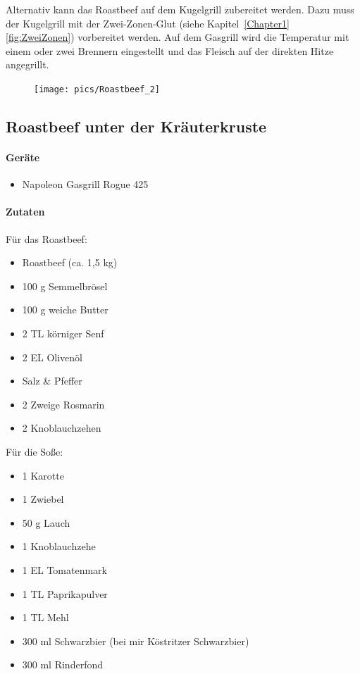 Alternativ kann das Roastbeef auf dem Kugelgrill zubereitet werden. Dazu
muss der Kugelgrill mit der Zwei-Zonen-Glut (siehe Kapitel~\ref{Chapter1} 
\vref{fig:ZweiZonen}) vorbereitet werden. Auf dem
Gasgrill wird die Temperatur mit einem oder zwei Brennern eingestellt und
das Fleisch auf der direkten Hitze angegrillt.
\newpage
\begin{figure}[htbp]
	\centering
	\begin{minipage}{1\textwidth}
		\centering
		\texttt{[image: pics/Roastbeef\_2]}
		\label{fig:Roastbeef}
	\end{minipage}
\end{figure}
\newpage

\subsection{Roastbeef unter der Kräuterkruste}

\paragraph{Geräte}

\begin{itemize}[noitemsep]
	\item Napoleon Gasgrill Rogue 425
\end{itemize}

\paragraph{Zutaten}

Für das Roastbeef:

\begin{itemize}[noitemsep]
	\item Roastbeef (ca. 1,5 kg) 
	\item 100 g Semmelbrösel
	\item 100 g weiche Butter
	\item 2 TL körniger Senf
	\item 2 EL Olivenöl
	\item Salz  \& Pfeffer
	\item 2 Zweige Rosmarin
	\item 2 Knoblauchzehen
\end{itemize}

Für die Soße:

\begin{itemize}[noitemsep]
\item 1 Karotte
\item 1 Zwiebel
\item 50 g Lauch
\item 1 Knoblauchzehe
\item 1 EL Tomatenmark
\item 1 TL Paprikapulver
\item 1 TL Mehl
\item 300 ml Schwarzbier (bei mir Köstritzer Schwarzbier)
\item 300 ml Rinderfond
\end{itemize}
\newpage

